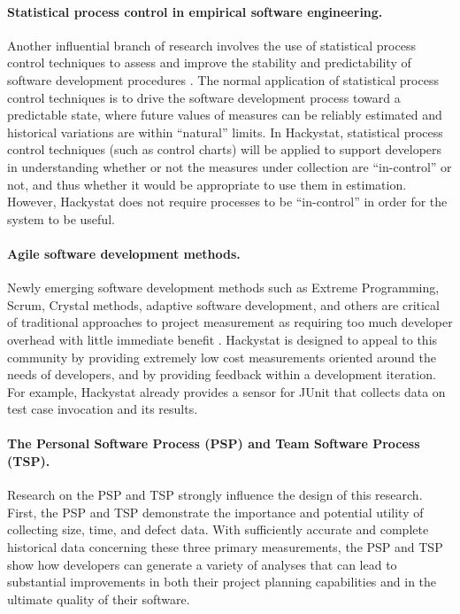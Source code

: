 \vspace*{-.15in} \paragraph{Statistical process control in empirical software engineering.}

Another influential branch of research involves the use of statistical
process control techniques to assess and improve the stability and
predictability of software development procedures
\cite{Florac97,Wheeler92}. The normal application of statistical process
control techniques is to drive the software development process toward a
predictable state, where future values of measures can be reliably
estimated and historical variations are within ``natural'' limits.  In
Hackystat, statistical process control techniques (such as control charts)
will be applied to support developers in understanding whether or not the
measures under collection are ``in-control'' or not, and thus whether it
would be appropriate to use them in estimation.  However, Hackystat does
not require processes to be ``in-control'' in order for the system to be
useful.


\vspace*{-.15in} \paragraph{Agile software development methods.}  

Newly emerging software development methods such as Extreme Programming,
Scrum, Crystal methods, adaptive software development, and others are
critical of traditional approaches to project measurement as requiring too
much developer overhead with little immediate benefit
\cite{Highsmith01,Jeffries01}. Hackystat is designed to appeal to this
community by providing extremely low cost measurements oriented around
the needs of developers, and by providing feedback within a development
iteration. For example, Hackystat already provides a sensor for JUnit that
collects data on test case invocation and its results.

\vspace*{-.15in} \paragraph{The Personal Software Process (PSP) and Team Software Process
(TSP).}  

Research on the PSP and TSP strongly influence the design of this research.
First, the PSP and TSP demonstrate the importance and potential utility of
collecting size, time, and defect data.  With sufficiently accurate and
complete historical data concerning these three primary measurements, the
PSP and TSP show how developers can generate a variety of analyses that can
lead to substantial improvements in both their project planning
capabilities and in the ultimate quality of their software.  

